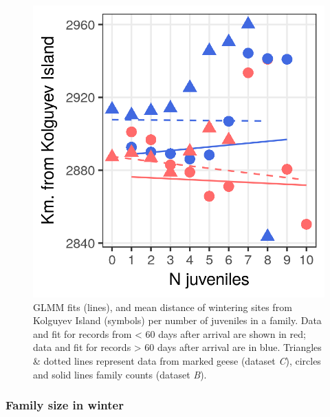 \documentclass[10pt,twocolumn]{paper}
\begin{document}
\begin{figure}[htbp]
\centering
\includegraphics{dist_fam.png}
\caption{GLMM fits (lines), and mean distance of wintering sites from
Kolguyev Island (symbols) per number of juveniles in a family. Data and
fit for records from \textless{} 60 days after arrival are shown in red;
data and fit for records \textgreater{} 60 days after arrival are in
blue. Triangles \& dotted lines represent data from marked geese
(dataset \emph{C}), circles and solid lines family counts (dataset
\emph{B}).}
\end{figure}

\subsubsection{Family size in winter}\label{family-size-in-winter}
\end{document}
